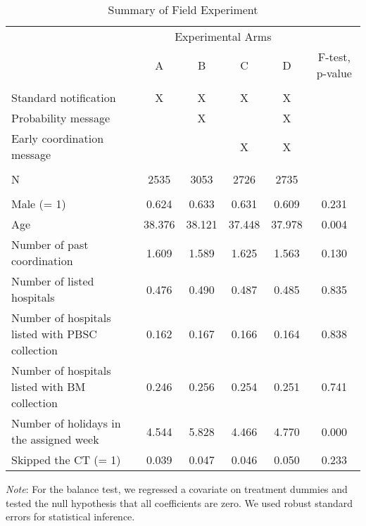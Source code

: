 \documentclass[12pt, a4paper]{article}
\begin{document}
\begin{table}

\caption{\label{tab:summary}Summary of Field Experiment}
\centering
\fontsize{9}{11}\selectfont
\begin{threeparttable}
\begin{tabular}[t]{lccccc}
\toprule
\multicolumn{1}{c}{ } & \multicolumn{4}{c}{Experimental Arms} & \multicolumn{1}{c}{ } \\
\cmidrule(l{3pt}r{3pt}){2-5}
 & A & B & C & D & F-test, p-value\\
\midrule
\addlinespace[0.3em]
\multicolumn{6}{l}{\textbf{A. Interventions}}\\
\hspace{1em}Standard notification & X & X & X & X & \\
\hspace{1em}Probability message &  & X &  & X & \\
\hspace{1em}Early coordination message &  &  & X & X & \\
\addlinespace[0.3em]
\multicolumn{6}{l}{\textbf{B. Sample Size}}\\
\hspace{1em}N & 2535 & 3053 & 2726 & 2735 & \\
\addlinespace[0.3em]
\multicolumn{6}{l}{\textbf{C. Balance Test}}\\
\hspace{1em}Male (= 1) & 0.624 & 0.633 & 0.631 & 0.609 & 0.231\\
\hspace{1em}Age & 38.376 & 38.121 & 37.448 & 37.978 & 0.004\\
\hspace{1em}Number of past coordination & 1.609 & 1.589 & 1.625 & 1.563 & 0.130\\
\hspace{1em}Number of listed hospitals & 0.476 & 0.490 & 0.487 & 0.485 & 0.835\\
\hspace{1em}Number of hospitals listed with PBSC collection & 0.162 & 0.167 & 0.166 & 0.164 & 0.838\\
\hspace{1em}Number of hospitals listed with BM collection & 0.246 & 0.256 & 0.254 & 0.251 & 0.741\\
\hspace{1em}Number of holidays in the assigned week & 4.544 & 5.828 & 4.466 & 4.770 & 0.000\\
\hspace{1em}Skipped the CT (= 1) & 0.039 & 0.047 & 0.046 & 0.050 & 0.233\\
\bottomrule
\end{tabular}
\begin{tablenotes}
\item \emph{Note}: For the balance test, we regressed a covariate on treatment dummies and tested the null hypothesis that all coefficients are zero. We used robust standard errors for statistical inference.
\end{tablenotes}
\end{threeparttable}
\end{table}
\end{document}
